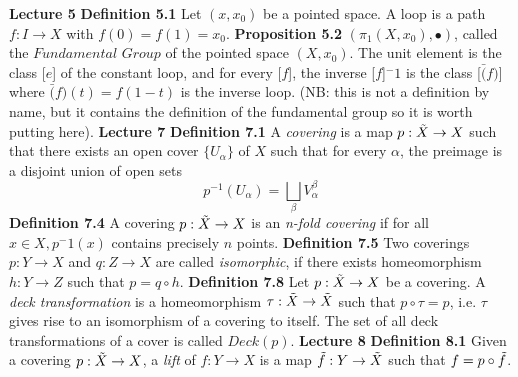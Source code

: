 \newline \newline \textbf{Lecture 5}
\newline \newline \textbf{Definition 5.1} Let $(x, x_0)$ be a pointed space. A loop is a path $f: I \rightarrow X$ with $f(0) = f(1) = x_0$.
\newline \newline \textbf{Proposition 5.2} $(\pi_{1}(X,x_0), \bullet)$, called the $\textit{Fundamental Group}$ of the pointed space $(X, x_0)$. The unit element is the class [$e$] of the constant loop, and for every [$f$], the inverse [$f$]$^-1$ is the class [$\bar(f)$] where $\bar(f)(t) = f(1-t)$ is the inverse loop.
\newline (NB: this is not a definition by name, but it contains the definition of the fundamental group so it is worth putting here).
\newline \newline \textbf{Lecture 7}
\newline \newline \textbf{Definition 7.1} A \textit{covering} is a map $p: \Tilde{X} \rightarrow X$ such that there exists an open cover $\{U_\alpha\}$ of $X$ such that for every $\alpha$, the preimage is a disjoint union of open sets $$ p^{-1}(U_\alpha) = \bigsqcup_{\beta}V_{\alpha}^{\beta}$$
\newline \newline \textbf{Definition 7.4} A covering $p: \Tilde{X} \rightarrow X$ is an \textit{n-fold covering} if for all $x \in X, p^-1(x)$ contains precisely $n$ points.
\newline \newline \textbf{Definition 7.5} Two coverings $p: Y \rightarrow X$ and $q: Z \rightarrow X$ are called \textit{isomorphic}, if there exists homeomorphism $h:Y \rightarrow Z$ such that $p = q \circ h$.
\newline \newline \textbf{Definition 7.8} Let $p: \Tilde{X} \rightarrow X$ be a covering. A \textit{deck transformation} is a homeomorphism $\tau: \Tilde{X} \rightarrow \Tilde{X}$ such that $p \circ \tau = p$, i.e. $\tau$ gives rise to an isomorphism of a covering to itself. The set of all deck transformations of a cover is called $Deck(p)$.
\newline \newline \textbf{Lecture 8} 
\newline \newline \textbf{Definition 8.1} Given a covering $p: \Tilde{X} \rightarrow X$, a \textit{lift} of $f: Y \rightarrow X$ is a map $\Tilde{f}: Y \rightarrow \Tilde{X}$ such that $f = p \circ \Tilde{f}$.
